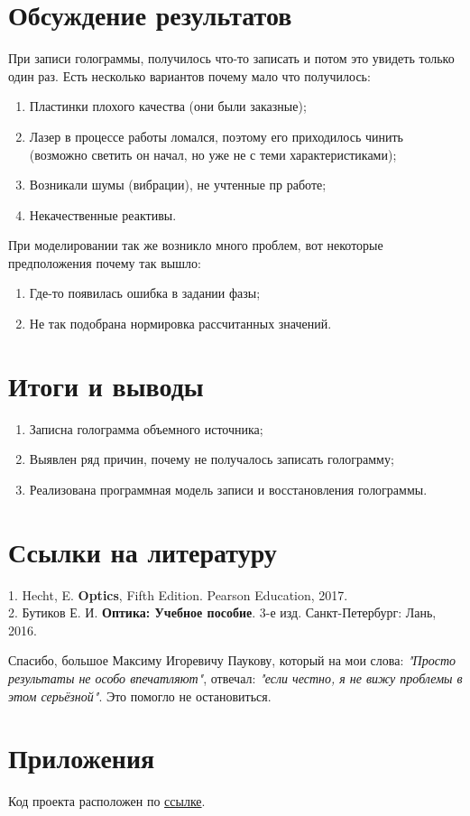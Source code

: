 \documentclass[aps,twocolumn,secnumarabic,balancelastpage,amsmath,amssymb,nofootinbib, floatfix]{revtex4-1}
\begin{document}
\section{Обсуждение результатов}
\par При записи голограммы, получилось что-то записать и потом это увидеть только один раз. Есть несколько вариантов почему мало что получилось:
\begin{enumerate}
	\item Пластинки плохого качества (они были заказные);
	\item Лазер в процессе работы ломался, поэтому его приходилось чинить (возможно светить он начал, но уже не с теми характеристиками);
	\item Возникали шумы (вибрации), не учтенные пр работе;
	\item Некачественные реактивы.
\end{enumerate}
\par При моделировании так же возникло много проблем, вот некоторые предположения почему так вышло:
\begin{enumerate}
	\item Где-то появилась ошибка в задании фазы;
	\item Не так подобрана нормировка рассчитанных значений.
\end{enumerate}
\section{ Итоги и выводы  }
\begin{enumerate}
	\item Записна голограмма объемного источника;
	\item Выявлен ряд причин, почему не получалось записать голограмму;
	\item Реализована программная модель записи и восстановления голограммы.
\end{enumerate}
\section{Ссылки на литературу}  

1. Hecht, E. \textbf{Optics}, Fifth Edition. Pearson Education, 2017.\\  
2. Бутиков Е. И. \textbf{Оптика: Учебное пособие}. 3-е изд. Санкт-Петербург: Лань, 2016.  
\begin{acknowledgments} 
	Спасибо, большое Максиму Игоревичу Паукову, который на мои слова: \textit{"Просто результаты не особо впечатляют"}, отвечал: \textit{"если честно, я не вижу проблемы в этом серьёзной"}. Это помогло не остановиться. 
\end{acknowledgments}
\section{Приложения}  
Код проекта расположен по \href{https://github.com/ArinaLuzgina/holographySimulation}{ссылке}.
\end{document}
